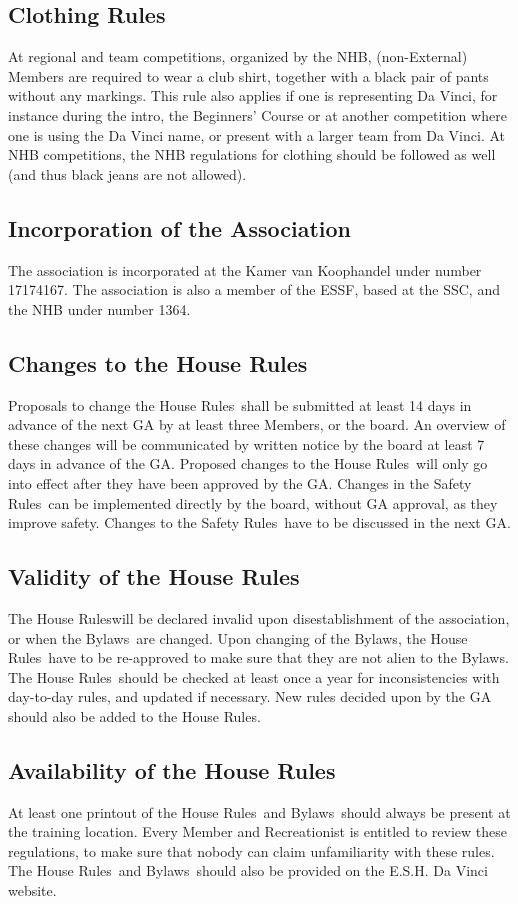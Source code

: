 \documentclass[a4paper]{article}
\newcommand{\Asta}{Bylaws} %
\newcommand{\Ahr}{House Rules} %
\newcommand{\Asr}{Safety Rules} %
\begin{document}
\subsection{Clothing Rules}
At regional and team competitions, organized by the NHB, (non-External) Members are required to wear a club shirt, together with a black pair of pants without any markings. This rule also applies if one is representing Da Vinci, for instance during the intro, the Beginners' Course or at another competition where one is using the Da Vinci name, or present with a larger team from Da Vinci. At NHB competitions, the NHB regulations for clothing should be followed as well (and thus black jeans are not allowed).

\subsection{Incorporation of the Association}
The association is incorporated at the Kamer van Koophandel under number 17174167. The association is also a member of the ESSF, based at the SSC, and the NHB under number 1364.

\subsection{Changes to the \Ahr}
Proposals to change the \Ahr\ shall be submitted at least 14 days in advance of the next GA by at least three Members, or the board. An overview of these changes will be communicated by written notice by the board at least 7 days in advance of the GA. Proposed changes to the \Ahr\ will only go into effect after they have been approved by the GA. Changes in the \Asr\ can be implemented directly by the board, without GA approval, as they improve safety. Changes to the \Asr\ have to be discussed in the next GA.

\subsection{Validity of the \Ahr}
The \Ahr will be declared invalid upon disestablishment of the association, or when the \Asta\ are changed. Upon changing of the \Asta , the \Ahr\ have to be re-approved to make sure that they are not alien to the \Asta . The \Ahr\ should be checked at least once a year for inconsistencies with day-to-day rules, and updated if necessary. New rules decided upon by the GA should also be added to the \Ahr .

\subsection{Availability of the \Ahr}
At least one printout of the \Ahr\ and \Asta\ should always be present at the training location. Every Member and Recreationist is entitled to review these regulations, to make sure that nobody can claim unfamiliarity with these rules. The \Ahr\ and \Asta\ should also be provided on the E.S.H. Da Vinci website.
\end{document}
